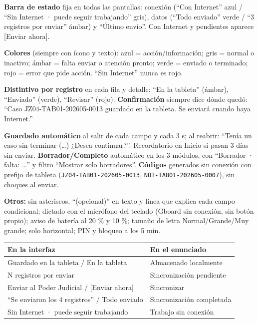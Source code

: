 \documentclass[11pt,a4paper]{article}
\begin{document}
\textbf{Barra de estado} fija en todas las pantallas: conexión (``Con Internet'' azul / ``Sin Internet · puede seguir trabajando'' gris), datos (``Todo enviado'' verde / ``3 registros por enviar'' ámbar) y ``Último envío''. Con Internet y pendientes aparece [Enviar ahora].

\textbf{Colores} (siempre con ícono y texto): azul = acción/información; gris = normal o inactivo; ámbar = falta enviar o atención pronto; verde = enviado o terminado; rojo = error que pide acción. ``Sin Internet'' nunca es rojo.

\textbf{Distintivo por registro} en cada fila y detalle: ``En la tableta'' (ámbar), ``Enviado'' (verde), ``Revisar'' (rojo). \textbf{Confirmación} siempre dice dónde quedó: ``Caso JZ04-TAB01-202605-0013 guardado en la tableta. Se enviará cuando haya Internet.''

\textbf{Guardado automático} al salir de cada campo y cada 3 s; al reabrir: ``Tenía un caso sin terminar (…) ¿Desea continuar?''. Recordatorio en Inicio si pasan 3 días sin enviar. \textbf{Borrador/Completo} automático en los 3 módulos, con ``Borrador · falta: …'' y filtro ``Mostrar solo borradores''. \textbf{Códigos} generados sin conexión con prefijo de tableta (\texttt{JZ04-TAB01-202605-0013}, \texttt{NOT-TAB01-202605-0007}), sin choques al enviar.

\textbf{Otros:} sin asteriscos, ``(opcional)'' en texto y línea que explica cada campo condicional; dictado con el micrófono del teclado (Gboard sin conexión, sin botón propio); aviso de batería al 20 \% y 10 \%; tamaño de letra Normal/Grande/Muy grande; solo horizontal; PIN y bloqueo a los 5 min.

\begin{center}
\begin{tabular}{|l|l|}\hline
\textbf{En la interfaz} & \textbf{En el enunciado}\\\hline
Guardado en la tableta / En la tableta & Almacenado localmente\\
N registros por enviar & Sincronización pendiente\\
Enviar al Poder Judicial / [Enviar ahora] & Sincronizar\\
``Se enviaron los 4 registros'' / Todo enviado & Sincronización completada\\
Sin Internet · puede seguir trabajando & Trabajo sin conexión\\\hline
\end{tabular}
\end{center}
\end{document}
